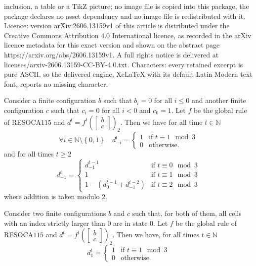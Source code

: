 \documentclass[10pt,a4paper]{amsart}
\newcommand{\N}{\ensuremath{\mathbb{N}}\xspace}
\newcommand{\RESOCA}{RESOCA\xspace}
\newcommand{\cvres}[2]{\ensuremath{\begin{bmatrix}#1\\#2\end{bmatrix}}\xspace}
\newcommand{\set}[1]{\ensuremath{\left\{#1\right\}}\xspace}
\begin{document}
inclusion, a table or a TikZ picture; no image file is copied into this package, the package declares no asset dependency and no image file is redistributed with it. Licence: version arXiv:2606.13159v1 of this article is distributed under the Creative Commons Attribution 4.0 International licence, as recorded in the arXiv licence metadata for this exact version and shown on the abstract page https://arxiv.org/abs/2606.13159v1. A full rights notice is delivered at licenses/arxiv-2606.13159-CC-BY-4.0.txt. Characters: every retained excerpt is pure ASCII, so the delivered engine, XeLaTeX with its default Latin Modern text font, reports no missing character.
\begin{lemma}
\label{lem:periodicity-1}
 Consider a finite configuration $b$ such that $b_i=0$ for all $i\leq0$ and another finite configuration $c$ such that $c_i=0$ for all $i<0$ and $c_0=1$. Let $f$ be the global rule of \RESOCA $115$ and $d^t=f^t\left(\cvres{b}{c}\right)_2$. Then we have for all time $t\in\N$
 \[
 \forall i\in\N\setminus\set{0,1}\quad d^t_{-i}=
 \begin{cases}
 1&\text{if\ }t\equiv1\mod3\\
 0&\text{otherwise.}
 \end{cases}
 \]
 and for all times $t\geq2$
 \[
 d^t_{-1}= \begin{cases}
 d^{t-1}_{-1}&\text{if\ }t\equiv0\mod3\\
 1&\text{if\ }t\equiv1\mod3\\
 1-(d^{t-1}_0+d^{t-2}_{-1})&\text{if\ }t\equiv2\mod3
 \end{cases}
 \]
 where addition is taken modulo $2$.
\end{lemma}

\begin{lemma}
\label{lem:periodicity-2}
 Consider two finite configurations $b$ and $c$
 such that, for both of them, all cells with an index strictly larger than $0$ are in state $0$. Let $f$ be the global rule of \RESOCA $115$ and $d^t=f^t\left(\cvres{b}{c}\right)_2$. Then we have, for all times $t\in\N$
 \[
 d^t_1=
 \begin{cases}
 1&\text{if\ }t\equiv1\mod3\\
 0&\text{otherwise.}
 \end{cases}
 \]
\end{lemma}
\end{document}
